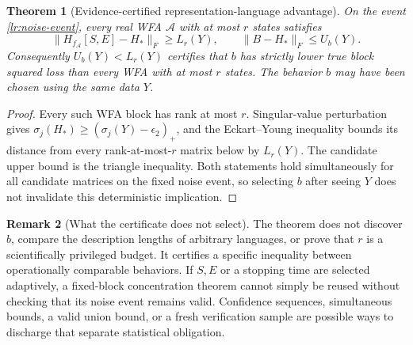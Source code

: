 \documentclass[11pt]{article}
\newtheorem{theorem}{Theorem}[section]
\theoremstyle{definition}
\newtheorem{remark}[theorem]{Remark}
\begin{document}
\begin{theorem}[Evidence-certified representation-language advantage]
\label{lr:class-comparison}
On the event \eqref{lr:noise-event}, every real WFA $\mathcal A$ with
at most $r$ states satisfies
\[
 \|H_{f_{\mathcal A}}[S,E]-H_*\|_F\geq L_r(Y),
 \qquad \|B-H_*\|_F\leq U_b(Y).
\]
Consequently $U_b(Y)<L_r(Y)$ certifies that $b$ has strictly lower true
block squared loss than \emph{every} WFA with at most $r$ states.
The behavior $b$ may have been chosen using the same data $Y$.
\end{theorem}
\begin{proof}
Every such WFA block has rank at most $r$. Singular-value perturbation
gives $\sigma_j(H_*)\geq(\sigma_j(Y)-\epsilon_2)_+$, and the
Eckart--Young inequality bounds its distance from every rank-at-most-$r$
matrix below by $L_r(Y)$. The candidate upper bound is the triangle
inequality. Both statements hold simultaneously for all candidate
matrices on the fixed noise event, so selecting $b$ after seeing $Y$
does not invalidate this deterministic implication.
\end{proof}

\begin{remark}[What the certificate does not select]
The theorem does not discover $b$, compare the description lengths of
arbitrary languages, or prove that $r$ is a scientifically privileged
budget. It certifies a specific inequality between operationally
comparable behaviors. If $S,E$ or a stopping time are selected adaptively,
a fixed-block concentration theorem cannot simply be reused without
checking that its noise event remains valid. Confidence sequences,
simultaneous bounds, a valid union bound, or a fresh verification sample
are possible ways to discharge that separate statistical obligation.
\end{remark}
\end{document}

